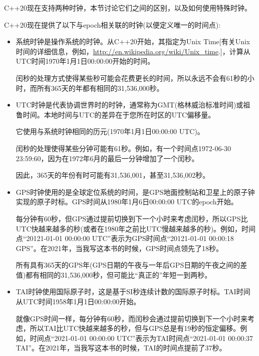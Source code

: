 
C++20现在支持两种时钟，本节讨论它们之间的区别，以及如何使用特殊时钟。


C++20现在提供了以下与epoch相关联的时钟(以便定义唯一的时间点):

\begin{itemize}
\item
系统时钟是操作系统的时钟。从C++20开始，其指定为Unix Time[有关Unix时间的详细信息，例如，\url{http://en.wikipedia.org/wiki/Unix_time}.]，计算从UTC时间1970年1月1日00:00:00开始的时间。

闰秒的处理方式使得某些秒可能会花费更长的时间，所以永远不会有61秒的小时，而所有365天的年都有相同的31,536,000秒。

\item
UTC时钟是代表协调世界时的时钟，通常称为GMT(格林威治标准时间)或祖鲁时间。本地时间与UTC的差异在于您所在时区的UTC偏移量。

它使用与系统时钟相同的历元(1970年1月1日00:00:00 UTC)。

闰秒的处理使得某些分钟可能有61秒。例如，有一个时间点1972-06-30 23:59:60，因为在1972年6月的最后一分钟增加了一个闰秒。

因此，365天的年份有时可能有31,536,001，甚至31,536,002秒。

\item
GPS时钟使用的是全球定位系统的时间，是GPS地面控制站和卫星上的原子钟实现的原子时标。GPS时间从1980年1月6日00:00:00 UTC的epoch开始。

每分钟有60秒，但GPS通过提前切换到下一个小时来考虑闰秒，所以GPS比UTC快越来越多的秒(或者在1980年之前比UTC慢越来越多的秒)。例如，时间点“20121-01-01 00:00:00 UTC”表示为GPS时间点“20121-01-01 00:00:18 GPS”。在2021年，当我写这本书的时候，GPS时间点领先了18秒。

所有具有365天的GPS年(GPS日期的午夜与一年后GPS日期的午夜之间的差值)都有相同的31,536,000秒，但可能比“真正的”年短一到两秒。

\item
TAI时钟使用国际原子时，这是基于SI秒连续计数的国际原子时标。TAI时间从UTC时间1958年1月1日00:00:00开始。

就像GPS时间一样，每分钟有60秒，而闰秒会通过提前切换到下一个小时来考虑，所以TAI比UTC快越来越多的秒，但与GPS总是有19秒的恒定偏移。例如，时间点“2021-01-01 00:00:00 UTC”表示为TAI时间点“2021-01-01 00:00:37 TAI”。在2021年，当我写这本书的时候，TAI的时间点提前了37秒。
\end{itemize}



